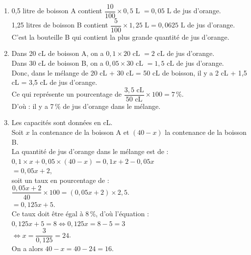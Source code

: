 \begin{corrige}
\ \\ [-5mm]
\begin{enumerate}
   \item 0,5 litre de boisson A contient $\dfrac{10}{100}\times0,5 \text{ L } =0,05 \text{ L}$ de jus d'orange. \\ [1mm]
      1,25 litres de boisson B contient $\dfrac{5}{100}\times1,25 \text{ L} = 0,0625 \text{ L}$ de jus d'orange. \\ [1mm]
      {\blue C'est la bouteille B qui contient la plus grande quantité de jus d'orange.}
   \item Dans 20 cL de boisson A, on a $0,1\times20 \text{ cL } =2 \text{ cL}$ de jus d'orange. \\
      Dans 30 cL de boisson B, on a $0,05\times30 \text{ cL } =1,5 \text{ cL}$ de jus d'orange. \\
      Donc, dans le mélange de 20 cL + 30 cL = 50 cL de boisson, il y a 2 cL + 1,5 cL = 3,5 cL de jus d'orange. \\ [1mm]
      Ce qui représente un pourcentage de $\dfrac{3,5\text{ cL}}{50\text{ cL}}\times100 =7\,\%$. \\ [1mm]
      D'où : {\blue il y a 7\,\% de jus d'orange dans le mélange.}
   \item Les capacités sont données en cL. \\
      Soit $x$ la contenance de la boisson A et $(40-x)$ la contenance de la boisson B. \\
      La quantité de jus d'orange dans le mélange est de : \\
      $0,1\times x+0,05\times(40-x) =0,1x+2-0,05x$ \\
      \hspace*{3.6cm} $=0,05x+2$, \\ [1mm]
      soit un taux en pourcentage de : \\ [1mm]
      $\dfrac{0,05x+2}{40}\times100 =(0,05x+2)\times2,5$. \\ [1mm]
      \hspace*{2.35cm} $=0,125x+5$. \\
      Ce taux doit être égal à 8\,\%, d'où l'équation : \\
      $0,125x+5 =8 \iff 0,125x= 8-5 =3$ \\ [1mm]
      \hspace*{2.2cm} $\iff x =\dfrac{3}{0,125} =24$. \\ [1mm]
      On a alors $40-x =40-24 =16$. \\     

\end{enumerate}
\end{corrige}
